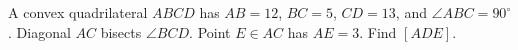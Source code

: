 A convex quadrilateral $ ABCD $ has $ AB=12 $, $ BC=5 $, $ CD=13 $, and $\angle ABC=90^\circ $. Diagonal $ AC $ bisects $\angle BCD $. Point $ E\in AC $ has $ AE=3 $. Find $[ADE]$.

